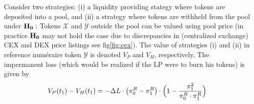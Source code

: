 \documentclass[11pt, letterpaper]{article}
\newcommand{\X}{\mathcal{X}}
\newcommand{\Y}{\mathcal{Y}}
\begin{document}
Consider two strategies: (i) a liquidity providing stategy where tokens are deposited into a pool, and (ii) a strategy where tokens are withheld from the pool under $\bf{H}_0:$ Tokens $\X$ and $\Y$ outside the pool can be valued using pool price (in practice $\bf{H}_0$ may not hold the case due to discrepancies in (centralized exchange) CEX and DEX price listings see fig\cref{fig:cex}). 
The value of strategies (i) and (ii) in reference num\'eraire token $\Y$ is denoted $V_P$ and $V_H$, respectively.
The impermanent loss (which would be realized if the LP were to burn his tokens) is given by 
\begin{equation}
V_P(t_1) - V_H(t_1)=-\Delta L\cdot \bigl(\pi_0^R-\pi_1^R\bigr)\cdot\Bigl(1-\frac{\pi_1^2}{\pi_0^R\cdot\pi_1^R}\Bigr)
\end{equation}
\end{document}
